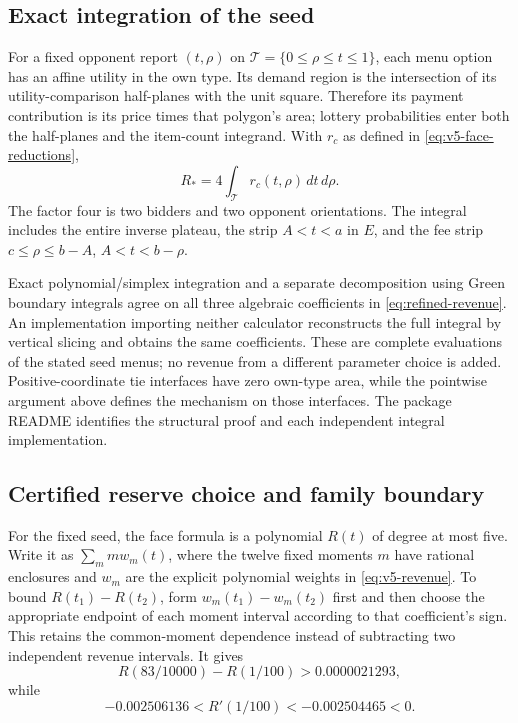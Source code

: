 \subsection{Exact integration of the seed}
For a fixed opponent report $(t,\rho)$ on
$\mathcal T=\{0\le\rho\le t\le1\}$, each menu option has an affine
utility in the own type. Its demand region is the intersection of its
utility-comparison half-planes with the unit square. Therefore its payment
contribution is its price times that polygon's area; lottery probabilities
enter both the half-planes and the item-count integrand. With $r_c$ as
defined in \eqref{eq:v5-face-reductions},
\[
 R_*=4\int_{\mathcal T}r_c(t,\rho)\,dt\,d\rho.
\]
The factor four is two bidders and two opponent orientations. The integral
includes the entire inverse plateau, the strip $A<t<a$ in $E$, and the
fee strip $c\le\rho\le b-A$, $A<t<b-\rho$.

Exact polynomial/simplex integration and a separate decomposition using
Green boundary integrals agree on all three algebraic coefficients in
\eqref{eq:refined-revenue}. An implementation importing neither calculator
reconstructs the full integral by vertical slicing and obtains the same
coefficients. These are complete evaluations of the stated seed menus;
no revenue from a different parameter choice is added. Positive-coordinate
tie interfaces have zero own-type area, while the pointwise argument above
defines the mechanism on those interfaces. The package README identifies
the structural proof and each independent integral implementation.

\subsection{Certified reserve choice and family boundary}\label{app:reserve-parameter}
For the fixed seed, the face formula is a polynomial $R(t)$ of degree
at most five. Write it as $\sum_m m w_m(t)$, where the twelve fixed moments
$m$ have rational enclosures and $w_m$ are the explicit polynomial weights
in \eqref{eq:v5-revenue}. To bound $R(t_1)-R(t_2)$, form
$w_m(t_1)-w_m(t_2)$ first and then choose the appropriate endpoint of each
moment interval according to that coefficient's sign. This retains the
common-moment dependence instead of subtracting two independent revenue intervals.
It gives
\[
 R(83/10000)-R(1/100)>0.0000021293,
\]
while
\[
 -0.002506136<R'(1/100)<-0.002504465<0.
\]

